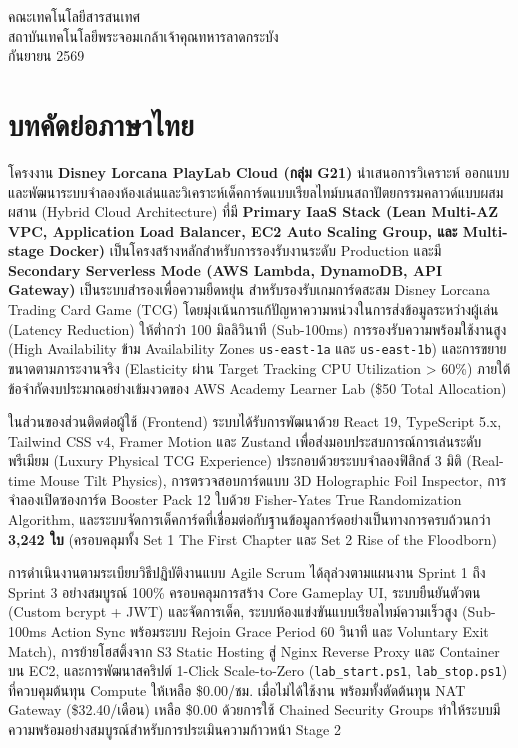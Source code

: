 \documentclass[12pt,a4paper]{report}
\begin{document}
\begin{titlepage}
\begin{center}
    \vfill
    {\fontsize{14pt}{18pt}\selectfont
    คณะเทคโนโลยีสารสนเทศ\\
    สถาบันเทคโนโลยีพระจอมเกล้าเจ้าคุณทหารลาดกระบัง\\
    กันยายน 2569}
\end{center}
\end{titlepage}

\setcounter{page}{1}

\chapter*{บทคัดย่อภาษาไทย}

โครงงาน \textbf{Disney Lorcana PlayLab Cloud (กลุ่ม G21)} นำเสนอการวิเคราะห์ ออกแบบ และพัฒนาระบบจำลองห้องเล่นและวิเคราะห์เด็คการ์ดแบบเรียลไทม์บนสถาปัตยกรรมคลาวด์แบบผสมผสาน (Hybrid Cloud Architecture) ที่มี \textbf{Primary IaaS Stack (Lean Multi-AZ VPC, Application Load Balancer, EC2 Auto Scaling Group, และ Multi-stage Docker)} เป็นโครงสร้างหลักสำหรับการรองรับงานระดับ Production และมี \textbf{Secondary Serverless Mode (AWS Lambda, DynamoDB, API Gateway)} เป็นระบบสำรองเพื่อความยืดหยุ่น สำหรับรองรับเกมการ์ดสะสม Disney Lorcana Trading Card Game (TCG) โดยมุ่งเน้นการแก้ปัญหาความหน่วงในการส่งข้อมูลระหว่างผู้เล่น (Latency Reduction) ให้ต่ำกว่า 100 มิลลิวินาที (Sub-100ms) การรองรับความพร้อมใช้งานสูง (High Availability ข้าม Availability Zones \texttt{us-east-1a} และ \texttt{us-east-1b}) และการขยายขนาดตามภาระงานจริง (Elasticity ผ่าน Target Tracking CPU Utilization > 60\%) ภายใต้ข้อจำกัดงบประมาณอย่างเข้มงวดของ AWS Academy Learner Lab (\$50 Total Allocation)

ในส่วนของส่วนติดต่อผู้ใช้ (Frontend) ระบบได้รับการพัฒนาด้วย React 19, TypeScript 5.x, Tailwind CSS v4, Framer Motion และ Zustand เพื่อส่งมอบประสบการณ์การเล่นระดับพรีเมียม (Luxury Physical TCG Experience) ประกอบด้วยระบบจำลองฟิสิกส์ 3 มิติ (Real-time Mouse Tilt Physics), การตรวจสอบการ์ดแบบ 3D Holographic Foil Inspector, การจำลองเปิดซองการ์ด Booster Pack 12 ใบด้วย Fisher-Yates True Randomization Algorithm, และระบบจัดการเด็คการ์ดที่เชื่อมต่อกับฐานข้อมูลการ์ดอย่างเป็นทางการครบถ้วนกว่า \textbf{3,242 ใบ} (ครอบคลุมทั้ง Set 1 The First Chapter และ Set 2 Rise of the Floodborn)

การดำเนินงานตามระเบียบวิธีปฏิบัติงานแบบ Agile Scrum ได้ลุล่วงตามแผนงาน Sprint 1 ถึง Sprint 3 อย่างสมบูรณ์ 100\% ครอบคลุมการสร้าง Core Gameplay UI, ระบบยืนยันตัวตน (Custom bcrypt + JWT) และจัดการเด็ค, ระบบห้องแข่งขันแบบเรียลไทม์ความเร็วสูง (Sub-100ms Action Sync พร้อมระบบ Rejoin Grace Period 60 วินาที และ Voluntary Exit Match), การย้ายโฮสติ้งจาก S3 Static Hosting สู่ Nginx Reverse Proxy และ Container บน EC2, และการพัฒนาสคริปต์ 1-Click Scale-to-Zero (\texttt{lab\_start.ps1}, \texttt{lab\_stop.ps1}) ที่ควบคุมต้นทุน Compute ให้เหลือ \$0.00/ชม. เมื่อไม่ได้ใช้งาน พร้อมทั้งตัดต้นทุน NAT Gateway (\$32.40/เดือน) เหลือ \$0.00 ด้วยการใช้ Chained Security Groups ทำให้ระบบมีความพร้อมอย่างสมบูรณ์สำหรับการประเมินความก้าวหน้า Stage 2
\end{document}

